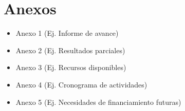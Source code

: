 \section{Anexos}
\begin{itemize}
\item Anexo 1 (Ej. Informe de avance)
\item Anexo 2 (Ej. Resultados parciales)
\item Anexo 3 (Ej. Recursos disponibles)
\item Anexo 4 (Ej. Cronograma de actividades)
\item Anexo 5 (Ej. Necesidades de financiamiento futuras)
\end{itemize}